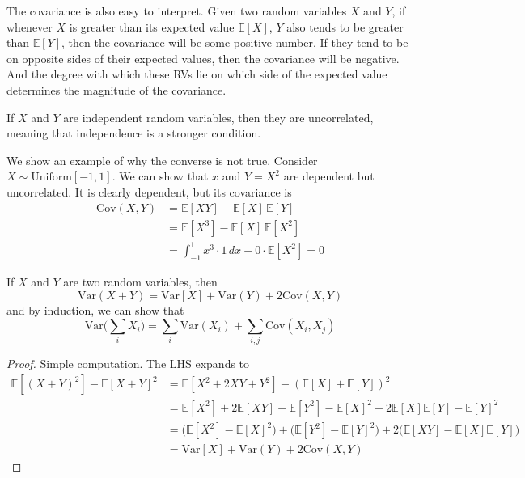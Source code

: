   The covariance is also easy to interpret. Given two random variables $X$ and $Y$, if whenever $X$ is greater than its expected value $\mathbb{E}[X]$, $Y$ also tends to be greater than $\mathbb{E}[Y]$, then the covariance will be some positive number. If they tend to be on opposite sides of their expected values, then the covariance will be negative. And the degree with which these RVs lie on which side of the expected value determines the magnitude of the covariance. 

  \begin{theorem}
    If $X$ and $Y$ are independent random variables, then they are uncorrelated, meaning that independence is a stronger condition. 
  \end{theorem}

  We show an example of why the converse is not true. Consider $X \sim \mathrm{Uniform}[-1, 1]$. We can show that $x$ and $Y = X^2$ are dependent but uncorrelated. It is clearly dependent, but its covariance is 
  \begin{align*}
    \mathrm{Cov}(X, Y) & = \mathbb{E}[X Y] - \mathbb{E}[X] \, \mathbb{E}[Y] \\
    & = \mathbb{E}[X^3] - \mathbb{E}[X] \, \mathbb{E}[X^2] \\
    & = \int_{-1}^1 x^3 \cdot 1 \,dx - 0 \cdot \mathbb{E}[X^2] = 0
  \end{align*}

  \begin{theorem}
    If $X$ and $Y$ are two random variables, then 
    \begin{equation}
      \mathrm{Var}(X + Y) = \mathrm{Var}[X] + \mathrm{Var}(Y) + 2 \mathrm{Cov}(X, Y)
    \end{equation}
    and by induction, we can show that 
    \begin{equation}
      \mathrm{Var}\bigg( \sum_i X_i\bigg) = \sum_{i} \mathrm{Var}(X_i) + \sum_{i, j} \mathrm{Cov}(X_i, X_j)
    \end{equation}
  \end{theorem}
  \begin{proof}
    Simple computation. The LHS expands to 
    \begin{align*}
      \mathbb{E}[(X + Y)^2] - \mathbb{E}[X + Y]^2 & = \mathbb{E}[X^2 + 2XY + Y^2] - (\mathbb{E}[X] + \mathbb{E}[Y])^2 \\
      & = \mathbb{E}[X^2] + 2 \mathbb{E}[XY] + \mathbb{E}[Y^2] - \mathbb{E}[X]^2 - 2 \mathbb{E}[X] \mathbb{E}[Y] - \mathbb{E}[Y]^2 \\
      & = \big( \mathbb{E}[X^2] - \mathbb{E}[X]^2 \big) + \big( \mathbb{E}[Y^2] - \mathbb{E}[Y]^2 \big) + 2 \big( \mathbb{E}[XY] - \mathbb{E}[X] \mathbb{E}[Y] \big) \\
      & = \mathrm{Var}[X] + \mathrm{Var}(Y) + 2 \mathrm{Cov}(X, Y) 
    \end{align*}
  \end{proof}

